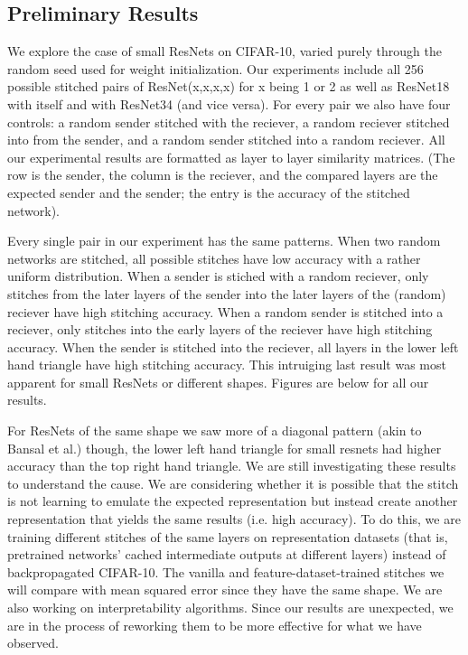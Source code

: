 \documentclass{article} %
\begin{document}
\subsection{Preliminary Results}
We explore the case of small ResNets on CIFAR-10, varied purely through the random seed used for weight initialization.
Our experiments include all 256 possible stitched pairs of ResNet(x,x,x,x) for x being 1 or 2 as well as ResNet18 with itself and with ResNet34
(and vice versa). For every pair we also have four controls: a random sender stitched with the reciever, a random reciever stitched
into from the sender, and a random sender stitched into a random reciever. All our experimental results are formatted as layer to
layer similarity matrices. (The row is the sender, the column is the reciever, and the compared layers are the expected sender
and the sender; the entry is the accuracy of the stitched network).

Every single pair in our experiment has the same
patterns. When two random networks are stitched, all possible stitches have low accuracy with a rather uniform distribution. When
a sender is stiched with a random reciever, only stitches from the later layers of the sender into the later layers of the (random)
reciever have high stitching accuracy. When a random sender is stitched into a reciever, only stitches into the early layers of the
reciever have high stitching accuracy. When the sender is stitched into the reciever, all layers in the lower left hand triangle
have high stitching accuracy. This intruiging last result was most apparent for small ResNets or different shapes.
Figures are below for all our results.

For ResNets of the same shape we saw more of a diagonal pattern (akin to Bansal et al.) though, the lower left hand triangle for small
resnets had higher
accuracy than the top right hand triangle. 
We are still investigating these results to understand the cause. We are considering
whether it is possible that the stitch is not learning to emulate the expected representation but instead create another representation
that yields the same results (i.e. high accuracy). To do this, we are training different stitches of the same layers on representation datasets
(that is, pretrained networks' cached intermediate outputs at different layers) instead of backpropagated CIFAR-10. The
vanilla and feature-dataset-trained stitches we will compare with mean squared error since they have the same shape.
We are also working on interpretability algorithms. Since our results are unexpected, we are in the process of reworking them to
be more effective for what we have observed.
\end{document}
